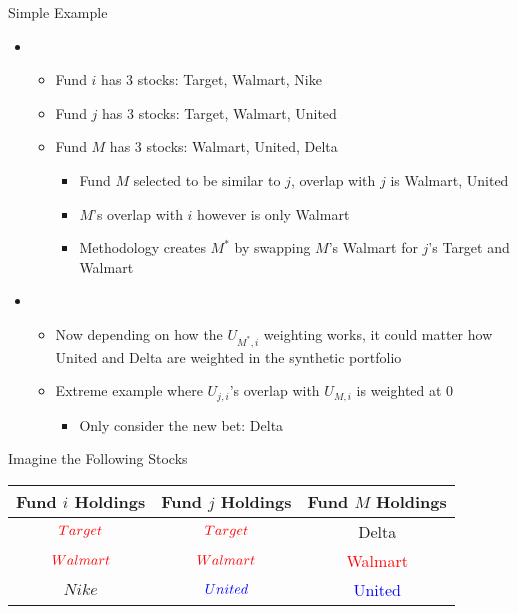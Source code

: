 \documentclass[12pt, aspectratio = 169%
]{beamer}
\newcommand{\1}{{\mathbbm{1}}}
\begin{document}
\begin{frame}{Simple Example}
\vspace*{-1em}
	\begin{itemize}	
		\item
		\begin{itemize} 
			\item Fund $i$ has 3 stocks: Target, Walmart, Nike
			\item Fund $j$ has 3 stocks: Target, Walmart, United
			\item Fund $M$ has 3 stocks: Walmart, United, Delta
				\begin{itemize}
					\item Fund $M$ selected to be similar to $j$, overlap with $j$ is Walmart, United
					\item $M$'s overlap with $i$ however is only Walmart
					\item Methodology creates $M^*$ by swapping $M$'s Walmart for $j$'s Target and 							Walmart
				\end{itemize}
		\end{itemize}
	\end{itemize}
	
	\begin{itemize}
		\item
		\begin{itemize}
			\item Now depending on how the $U_{M^*,i}$ weighting works, it could matter how United 				and Delta are weighted in the synthetic portfolio
			\item Extreme example where $U_{j,i}$'s overlap with $U_{M,i}$ is weighted at 0
				\begin{itemize}	
					\item Only consider the new bet: Delta
				\end{itemize}
		\end{itemize}
	\end{itemize}

\end{frame}

\begin{frame}{Imagine the Following Stocks}
\begin{center}
\begin{tabular}{|c|c|c|}
\hline
Fund $i$ Holdings & Fund $j$ Holdings & Fund $M$ Holdings \tabularnewline
\hline
\hline 
$\textcolor{red}{Target}$ & $\textcolor{red}{Target}$ & \textcolor{AlertColor}{Delta} \tabularnewline
\hline  
$\textcolor{red}{Walmart}$ & $\textcolor{red}{Walmart}$ & \textcolor{red}{Walmart} \tabularnewline
\hline 
$Nike$ & $\textcolor{blue}{United}$  & \textcolor{blue}{United} \tabularnewline
\hline 

\end{tabular}
\par\end{center}
\end{frame}
\end{document}
